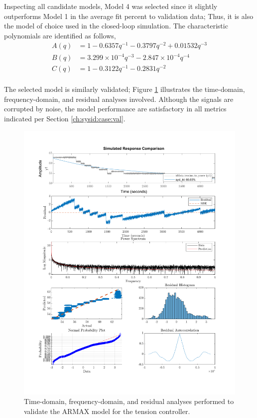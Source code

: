 Inspecting all candidate models, Model 4 was selected since it slightly outperforms Model 1 in the average fit percent to validation data; Thus, it is also the model of choice used in the closed-loop simulation. The characteristic polynomials are identified as follows, 
\begin{equation*}
    \begin{split}
        A(q) & = 1 - 0.6357 q^{-1} - 0.3797 q^{-2} + 0.01532 q^{-3}\\
        B(q) & = 3.299\times 10^{-4} q^{-3} - 2.847\times 10^{-4} q^{-4}\\
        C(q) & = 1 - 0.3122 q^{-1} - 0.2831 q^{-2}\\
    \end{split}
\end{equation*}

The selected model is similarly validated; Figure \ref{fig:sysid_validate_kt} illustrates the time-domain, frequency-domain, and residual analyses involved. Although the signals are corrupted by noise, the model performance are satisfactory in all metrics indicated per Section \ref{ch:sysid:case:val}.

\begin{figure}
    \centering
    \includegraphics[width=\textwidth]{figures/sysid_validate_kt.png}
    \caption{Time-domain, frequency-domain, and residual analyses performed to validate the ARMAX model for the tension controller.}
    \label{fig:sysid_validate_kt}
\end{figure}